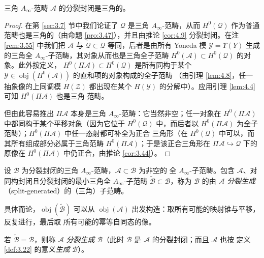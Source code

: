 \begin{Lem}\label{lem:4.14}
三角 $A_\infty$-范畴 $\mathcal A$ 的分裂封闭是三角的。
\end{Lem}

\begin{proof}
在第 \ref{sec:3.7} 节中我们论证了 $\mathcal Q$ 是三角 $A_\infty$-范畴，从而
$H^0(\mathcal Q)$ 作为普通范畴也是三角的（由命题 \ref{pro:3.47}），并且由推论
\ref{cor:4.9} 分裂封闭。在注 \ref{rem:3.55} 中我们把 $\mathcal A$ 与
$\widetilde{\mathcal Q}\subset\mathcal Q$ 等同，后者是由所有 Yoneda 模
$\mathcal Y=\Upsilon(Y)$ 生成的三角全 $A_\infty$-子范畴，其对象从而也是三角全子范畴
$H^0(\mathcal A)\subset H^0(\mathcal Q)$ 的对象。此外按定义，
$H^0(\Pi\mathcal A)\subset H^0(\mathcal Q)$ 是所有同构于某个
$\mathcal Y\in\operatorname{obj}(H^0(\mathcal A))$ 的直和项的对象构成的全子范畴
（由引理 \ref{lem:4.8}，任一抽象像的上同调模 $H(\mathcal Z)$ 都出现在某个
$H(\mathcal Y)$ 的分解中）。应用引理 \ref{lem:4.4} 可知 $H^0(\Pi\mathcal A)$ 也是三角
范畴。

但由此容易推出 $\Pi\mathcal A$ 本身是三角 $A_\infty$-范畴：它当然非空；任一对象在
$H^0(\Pi\mathcal A)$ 中都同构于某个平移对象（因为它位于 $H^0(\mathcal Q)$ 中，而后者以
$H^0(\Pi\mathcal A)$ 为全子范畴）；$H^0(\Pi\mathcal A)$ 中任一态射都可补全为正合
三角形（在 $H^0(\mathcal Q)$ 中可以，而其所有组成部分必属于三角范畴
$H^0(\Pi\mathcal A)$；于是该正合三角形在 $\Pi\mathcal A\hookrightarrow\mathcal Q$
下的原像在 $H^0(\Pi\mathcal A)$ 中仍正合，由推论 \ref{cor:3.44}）。
\end{proof}

\begin{Def}\label{def:4.15}
设 $\mathcal B$ 为分裂封闭的三角 $A_\infty$-范畴，$\mathcal A\subset\mathcal B$ 为非空的
全 $A_\infty$-子范畴。包含 $\mathcal A$、对同构封闭且分裂封闭的最小三角全
$A_\infty$-子范畴 $\widetilde{\mathcal B}\subset\mathcal B$，称为 $\mathcal B$ 的由
$\mathcal A$ \emph{分裂生成}（split-generated）的（三角）子范畴。

具体而论，$\operatorname{obj}(\widetilde{\mathcal B})$ 可以从
$\operatorname{obj}(\mathcal A)$ 出发构造：取所有可能的映射锥与平移，反复进行，最后取
所有可能的幂等自同态的像。

若 $\widetilde{\mathcal B}=\mathcal B$，则称 $\mathcal A$ \emph{分裂生成}
$\mathcal B$（此时 $\mathcal B$ 是 $\mathcal A$ 的分裂封闭；而且 $\mathcal A$ 也按
定义 \ref{def:3.22} 的意义\emph{生成} $\mathcal B$）。
\end{Def}

